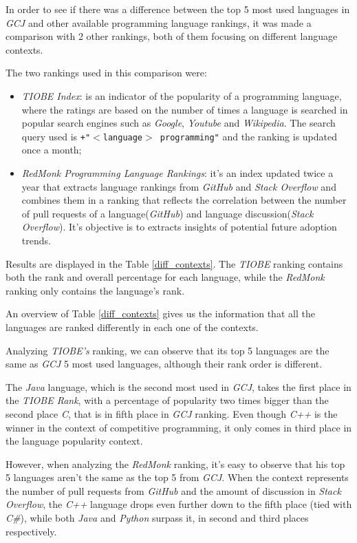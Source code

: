 \documentclass{article}
\begin{document}
\begin{multicols*}{2}
In order to see if there was a difference between the top 5 most used languages in \textit{GCJ} and other available programming language rankings, it was made a comparison with 2 other rankings, both of them focusing on different language contexts.

The two rankings used in this comparison were:
\begin{itemize}
    \item \textit{TIOBE Index}: is an indicator of the popularity of a programming language\cite{tiobe}, where the ratings are based on the number of times a language is searched in popular search engines such as \textit{Google}, \textit{Youtube} and \textit{Wikipedia}. The search query used is \texttt{+"$<$language$>$ programming"} and the ranking is updated once a month;
    \item \textit{RedMonk Programming Language Rankings}: it's an index updated twice a year that extracts language rankings from \textit{GitHub} and \textit{Stack Overflow} and combines them in a ranking that reflects the correlation between the number of pull requests of a language(\textit{GitHub}) and language discussion(\textit{Stack Overflow})\cite{redmonk}. It's objective is to extracts insights of potential future adoption trends.
\end{itemize}


Results are displayed in the Table \ref{diff_contexts}. The \textit{TIOBE} ranking contains both the rank and overall percentage for each language, while the \textit{RedMonk} ranking only contains the language's rank.

An overview of Table \ref{diff_contexts} gives us the information that all the languages are ranked differently in each one of the contexts.


Analyzing \textit{TIOBE's} ranking, we can observe that its top 5 languages are the same as \textit{GCJ} 5 most used languages, although their rank order is different.

The \textit{Java} language, which is the second most used in \textit{GCJ}, takes the first place in the \textit{TIOBE Rank}, with a percentage of popularity two times bigger than the second place \textit{C}, that is in fifth place in \textit{GCJ} ranking. Even though \textit{C++} is the winner in the context of competitive programming, it only comes in third place in the language popularity context.


However, when analyzing the \textit{RedMonk} ranking, it's easy to observe that his top 5 languages aren't the same as the top 5 from \textit{GCJ}. When the context represents the number of pull requests from \textit{GitHub} and the amount of discussion in \textit{Stack Overflow}, the \textit{C++} language drops even further down to the fifth place (tied with \textit{C\#}), while both \textit{Java} and \textit{Python} surpass it, in second and third places respectively.


\end{multicols*}
\end{document}

